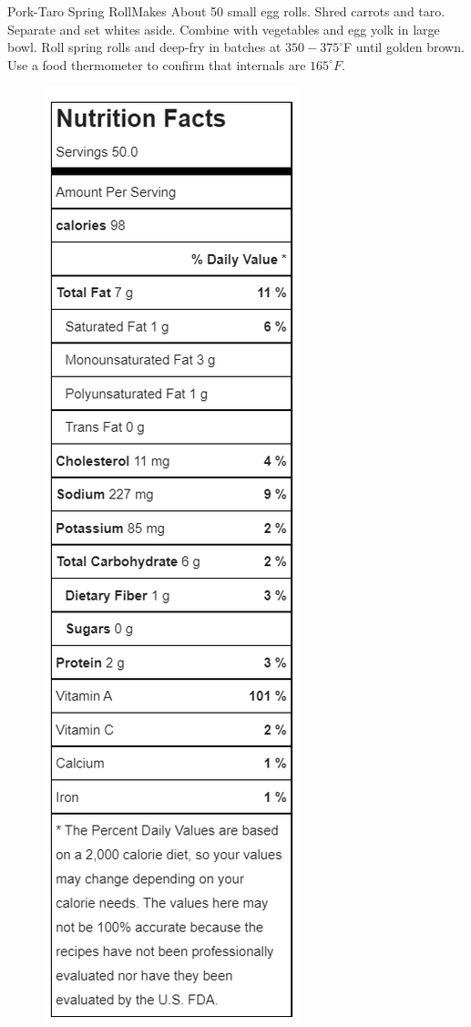\documentclass[]{article}
\title{}
\author{}
\begin{document}
\begin{recipe}{Pork-Taro Spring Roll}{}{Makes About 50 small egg rolls.}
	Shred carrots and taro. 
	Separate and set whites aside. 
	Combine with vegetables and egg yolk in large bowl.
	Roll spring rolls and deep-fry in batches at $350-375^\circ$F until golden brown. Use a food thermometer to confirm that internals are $165^\circ F$.
	\ingredient[]{}{}
\end{recipe}

\begin{figure}[h]
	\center
	\includegraphics[width=0.25\linewidth]{MFP.png}
\end{figure}
\end{document}
